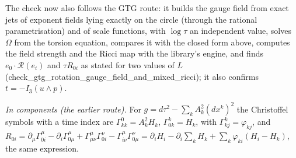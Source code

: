 The check now also follows the GTG route: it builds the gauge field from exact jets of exponent fields lying exactly on the circle (through the rational parametrisation) and of scale functions, with $\log\tau$ an independent value, solves $\Omega$ from the torsion equation, compares it with the closed form above, computes the field strength and the Ricci map with the library's engine, and finds $e_{0}\cdot\mathcal{R}(e_{i})$ and $\tau R_{0i}$ as stated for two values of $L$ (check\_gtg\_rotation\_gauge\_field\_and\_mixed\_ricci); it also confirms $t = -I_{3}(u \wedge p)$.

\emph{In components (the earlier route).} For $g = d\tau^{2} - \sum_{k}A_{k}^{2}(dx^{k})^{2}$ the Christoffel symbols with a time index are $\Gamma^{0}_{kk} = A_{k}^{2}H_{k}$, $\Gamma^{k}_{0k} = H_{k}$, with $\Gamma^{k}_{kj} = \varphi_{kj}$, and $R_{0i} = \partial_{\mu}\Gamma^{\mu}_{0i} - \partial_{i}\Gamma^{\mu}_{0\mu} + \Gamma^{\mu}_{\mu\nu}\Gamma^{\nu}_{0i} - \Gamma^{\mu}_{i\nu}\Gamma^{\nu}_{0\mu} = \partial_{i}H_{i} - \partial_{i}\sum_{k}H_{k} + \sum_{k}\varphi_{ki}(H_{i} - H_{k})$, the same expression.
